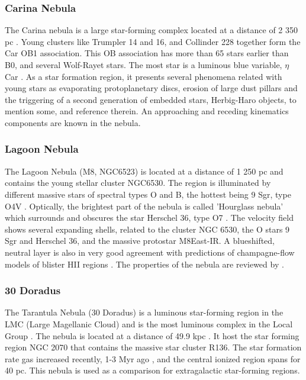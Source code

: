 \documentclass[fleqn,usenatbib, useAMS, a4paper]{mnras}
\begin{document}
\subsubsection{Carina Nebula}
\label{sec:carina-nebula}

The Carina nebula is a large star-forming complex located at a distance of 2 350 pc \citep{2006ApJ...644.1151S}.
Young clusters like Trumpler 14 and 16, and Collinder 228 together form the Car OB1 association.
This OB association has more than 65 stars earlier than B0, and several Wolf-Rayet stars.
The most star is a luminous blue variable, $\eta$ Car \citep{Damiani:2016a}.
As a star formation region, it presents several phenomena related with young stars as evaporating protoplanetary discs, erosion of large dust pillars and the triggering of a second generation of embedded stars, Herbig-Haro objects, to mention some, \citet{2008hsf2.book..138S} and reference therein.
An approaching and receding kinematics components are known in the nebula.

\subsubsection{Lagoon Nebula}
\label{sec:lagoon-nebula}


The Lagoon Nebula (M8, NGC6523) is located at a distance of 1 250 pc \citep{2005A&A...430..941P} and contains the young stellar cluster NGC6530.
The region is illuminated by different massive stars of spectral types O and B, the hottest being 9 Sgr, type O4V \citep{Damiani:2017b}.
Optically, the brightest part of the nebula is called 'Hourglass nebula' which surrounds and obscures the star Herschel 36, type O7 \citep{1986AJ.....91..870W}. 
The velocity field shows several expanding shells, related to the cluster NGC 6530, the O stars 9 Sgr and Herschel 36, and the massive protostar M8East-IR. A blueshifted, neutral layer is also in very good agreement with predictions of champagne-flow models of blister HII regions \citep{Damiani:2017b}. The properties of the nebula are reviewed by \citet{2008hsf2.book..533T}.

\subsubsection{30 Doradus}
\label{sec:30-doradus}

The Tarantula Nebula (30 Doradus) is a luminous star-forming region in the LMC (Large Magellanic Cloud) and is the most luminous complex in the Local Group \citep{1984ApJ...287..116K}. The nebula is located at a distance of 49.9 kpc \citep{2013Natur.495...76P}.
It host the star forming region NGC 2070 that contains the massive star cluster R136. 
The star formation rate gas increased recently, 1-3 Myr ago \citep{2016ApJ...833..154C}, and the central ionized region spans for 40 pc.
This nebula is used as a comparison for extragalactic star-forming regions.
\end{document}
